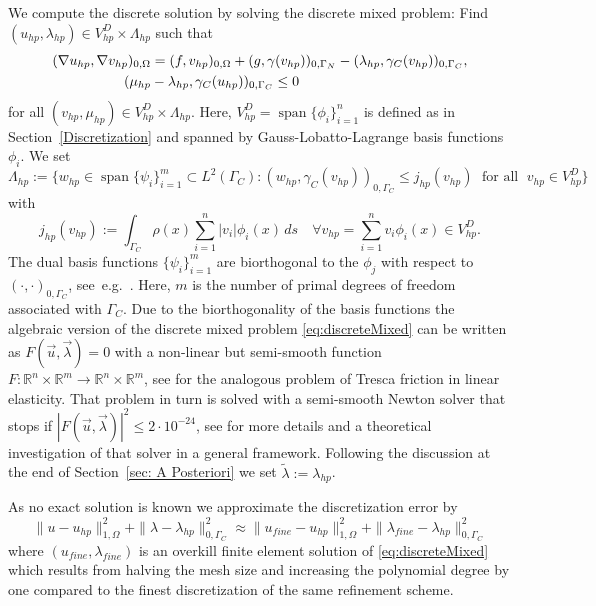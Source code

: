 \documentclass[12pt,twoside,reqno]{amsart}
\theoremstyle{definition}
\numberwithin{equation}{section}
\begin{document}
We compute the discrete solution by solving the discrete mixed problem: Find $(u_{hp},\lambda_{hp}) \in V^D_{hp} \times \Lambda_{hp}$ such that
\begin{equation} \label{eq:discreteMixed}
    \aligned
      (\nabla u_{hp}, \nabla v_{hp})_{0,\Omega} &= (f,v_{hp})_{0,\Omega}+(g,\gamma(v_{hp}))_{0,\Gamma_N}-(\lambda_{hp},\gamma_C(v_{hp}))_{0,\Gamma_C},\\
      (\mu_{hp}&-\lambda_{hp},\gamma_C(u_{hp}))_{0,\Gamma_C}\leq 0
  \endaligned
\end{equation}
for all $(v_{hp},\mu_{hp}) \in V^D_{hp} \times \Lambda_{hp}$. Here, $V^D_{hp}=\operatorname{span}\{\phi_i\}_{i=1}^n$ is defined as in Section~\ref{Discretization} and spanned by Gauss-Lobatto-Lagrange basis functions $\phi_i$.  We set
$$\Lambda_{hp}:= \{w_{hp}\in \operatorname{span}\{\psi_i\}_{i=1}^m \subset L^2(\Gamma_C): (w_{hp},\gamma_C(v_{hp}))_{0,\Gamma_C}\leq j_{hp}(v_{hp}) \;\text{ for all }\; v_{hp}\in V^D_{hp}\}$$
with $$ j_{hp}(v_{hp}) := \int_{\Gamma_C} \rho(x) \sum_{i=1}^n |v_i| \phi_i(x) \, ds \quad \forall v_{hp} = \sum_{i=1}^n v_i \phi_i(x) \in V_{hp}^D.$$
The dual basis functions $\{\psi_i\}_{i=1}^m$ are biorthogonal to the $\phi_j$ with respect to $(\cdot,\cdot)_{0,\Gamma_C}$, see~e.g.~\cite{Banz2015b,Banz2015a}.  Here, $m$ is the number of primal degrees of freedom associated with $\Gamma_C$. Due to the biorthogonality of the basis functions the algebraic version of the discrete mixed problem \eqref{eq:discreteMixed} can be written as $F(\vec{u},\vec{\lambda})=0$ with a non-linear but semi-smooth function $F: \mathbb{R}^n \times \mathbb{R}^m \rightarrow \mathbb{R}^n \times \mathbb{R}^m$, see \cite{Banz2015b} for the analogous problem of Tresca friction in linear elasticity. That problem in turn is solved with a semi-smooth Newton solver that stops if $|F(\vec{u},\vec{\lambda})|^2\leq 2 \cdot 10^{-24}$, see \cite{Bammer2025Solver} for more details and a theoretical investigation of that solver in a general framework.
Following the discussion at the end of Section~\ref{sec: A Posteriori} we set $\tilde{\lambda} := \lambda_{hp}$.

As no exact solution is known we approximate the discretization error by
\begin{equation} \label{eq:fric:def_error} 
\|u-u_{hp}\|_{1,\Omega}^2 + \|\lambda - \lambda_{hp}\|_{0,\Gamma_C}^2 \approx \|u_{fine}-u_{hp}\|_{1,\Omega}^2 + \|\lambda_{fine} - \lambda_{hp}\|_{0,\Gamma_C}^2 
\end{equation}
where $(u_{fine},\lambda_{fine})$ is an overkill finite element solution of \eqref{eq:discreteMixed} which results from halving the mesh size and increasing the polynomial degree by one compared to the finest discretization of the same refinement scheme. 
\end{document}
